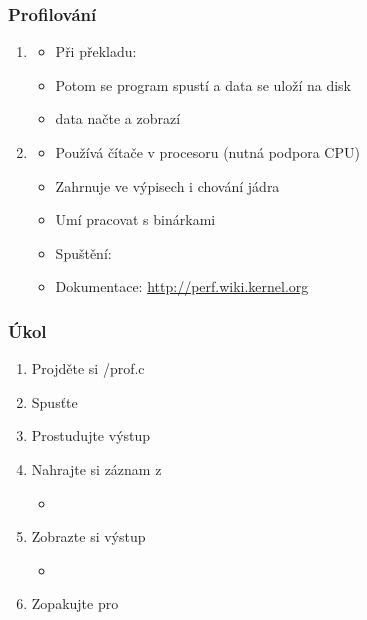 
\begin{frame}
  \frametitle{Profilování}

  \begin{enumerate}
    \item {}
    \begin{itemize}
      \item Při překladu: 
      \item Potom se program spustí a data se uloží na disk
      \item {} data načte a zobrazí
    \end{itemize}

    \pause

    \item {}
    \begin{itemize}
      \item Používá čítače v procesoru (nutná podpora CPU)
      \item Zahrnuje ve výpisech i chování jádra
      \item Umí pracovat s  binárkami
      \item Spuštění: 
      \item Dokumentace: \url{http://perf.wiki.kernel.org}
    \end{itemize}

  \end{enumerate}

\end{frame}

\begin{frame}
  \frametitle{Úkol}

  \begin{enumerate}
    \item Projděte si \ifpbbin {} /prof.c \fi
    \item Spusťte 
    \item Prostudujte výstup 

    \bigskip

    \item Nahrajte si záznam z 
    \begin{itemize}
      \item {}
    \end{itemize}
    \item Zobrazte si výstup
    \begin{itemize}
      \item {}
    \end{itemize}
    \item Zopakujte  pro 
  \end{enumerate}

\end{frame}

